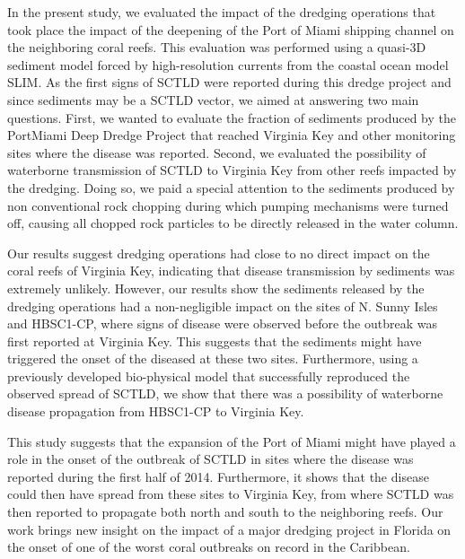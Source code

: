 In the present study, we evaluated the impact of the dredging operations that took place the impact of the deepening of the Port of Miami shipping channel on the neighboring coral reefs. This evaluation was performed using a quasi-3D sediment model forced by high-resolution currents from the coastal ocean model SLIM. As the first signs of SCTLD were reported during this dredge project and since sediments may be a SCTLD vector, we aimed at answering two main questions. First, we wanted to evaluate the fraction of sediments produced by the PortMiami Deep Dredge Project that reached Virginia Key and other monitoring sites where the disease was reported. Second, we evaluated the possibility of waterborne transmission of SCTLD to Virginia Key from other reefs impacted by the dredging. Doing so, we paid a special attention to the sediments produced by non conventional rock chopping during which pumping mechanisms were turned off, causing all chopped rock particles to be directly released in the water column.

Our results suggest dredging operations had close to no direct impact on the coral reefs of Virginia Key, indicating that disease transmission by sediments was extremely unlikely. However, our results show the sediments released by the dredging operations had a non-negligible impact on the sites of N. Sunny Isles and HBSC1-CP, where signs of disease were observed before the outbreak was first reported at Virginia Key. This suggests that the sediments might have triggered the onset of the diseased at these two sites. Furthermore, using a previously developed bio-physical model that successfully reproduced the observed spread of SCTLD, we show that there was a possibility of waterborne disease propagation from HBSC1-CP to Virginia Key.

This study suggests that the expansion of the Port of Miami might have played a role in the onset of the outbreak of SCTLD in sites where the disease was reported during the first half of 2014. Furthermore, it shows that the disease could then have spread from these sites to Virginia Key, from where SCTLD was then reported to propagate both north and south to the neighboring reefs. Our work brings new insight on the impact of a major dredging project in Florida on the onset of one of the worst coral outbreaks on record in the Caribbean.

